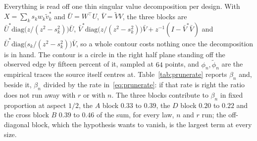 \documentclass[11pt]{article}
\theoremstyle{definition}
\newcommand{\numShareAMax}{0.39}
\newcommand{\numShareAMin}{0.33}
\newcommand{\numShareBMax}{0.46}
\newcommand{\numShareBMin}{0.39}
\newcommand{\numShareDMax}{0.22}
\newcommand{\numShareDMin}{0.20}
\begin{document}
Everything is read off one thin singular value decomposition per design. With
$X=\sum_k s_kw_k\tilde v_k^*$ and $\bar U=W^\top U$, $\bar V=\tilde VV$,
the three blocks are $\bar U^*\mathrm{diag}\big(z/(z^2-s_k^2)\big)\bar U$,
$\bar V^*\mathrm{diag}\big(z/(z^2-s_k^2)\big)\bar V+z^{-1}(I-\bar V^*\bar V)$ and
$\bar U^*\mathrm{diag}\big(s_k/(z^2-s_k^2)\big)\bar V$, so a whole contour costs nothing once the
decomposition is in hand. The contour is a circle in the right half plane standing off the observed
edge by fifteen percent of it, sampled at $64$ points, and $\phi_n,\widetilde\phi_n$ are the
empirical traces the source itself centres at. Table~\ref{tab:prunerate} reports $\beta_n$ and,
beside it, $\beta_n$ divided by the rate in~\eqref{eq:prunerate}: if that rate is right the ratio
does not run away with $r$ or with $n$. The three blocks contribute to $\beta_n$ in fixed
proportion at aspect $1/2$, the $A$ block $\numShareAMin$ to $\numShareAMax$, the $D$ block
$\numShareDMin$ to $\numShareDMax$ and the cross block $B$ $\numShareBMin$ to $\numShareBMax$ of the
sum, for every law, $n$ and $r$ run; the off-diagonal block, which the hypothesis wants to vanish, is
the largest term at every size.
\end{document}
